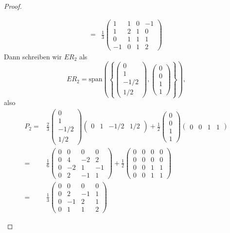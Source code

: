 \begin{proof}
\begin{parts}
\begin{align*}
			=&\frac{1}{3} \begin{pmatrix} 1 & 1 & 0 & -1 \\ 1 & 2 & 1 & 0 \\ 0 & 1 & 1 & 1 \\ -1 & 0 & 1 & 2 \end{pmatrix} 
		\end{align*}
		Dann schreiben wir $ER_2$ als
		\[
			ER_2=\text{span}\left( \left\{ \begin{pmatrix} 0 \\ 1 \\ -1 / 2 \\ 1 /2 \end{pmatrix} , \begin{pmatrix} 0 \\ 0 \\ 1 \\ 1 \end{pmatrix}  \right\}  \right) 
		,\]
		also
		\begin{align*}
			P_2=&\frac{2}{3}\begin{pmatrix}  0 \\ 1 \\ -1 / 2 \\ 1 / 2 \end{pmatrix} \begin{pmatrix}  0 & 1 & -1 / 2 & 1 / 2 \end{pmatrix} +\frac{1}{2}\begin{pmatrix}  0 \\ 0 \\ 1 \\ 1 \end{pmatrix} \begin{pmatrix} 0 & 0 & 1 & 1 \end{pmatrix}\\
			=&\frac{1}{6}\begin{pmatrix} 0 & 0 & 0 & 0 \\ 0 & 4 & -2 & 2 \\ 0 & -2 & 1 & -1 \\ 0 & 2 & -1 & 1 \end{pmatrix}+\frac{1}{2}\begin{pmatrix} 0 & 0 & 0 & 0 \\ 0 & 0 & 0 & 0 \\ 0 & 0 & 1 & 1 \\ 0 & 0 & 1 & 1 \end{pmatrix} \\
			=& \frac{1}{3}\begin{pmatrix}  0 & 0 & 0 & 0 \\ 0 & 2 & -1 & 1 \\ 0 & -1 & 2 & 1 \\ 0 & 1 & 1 & 2 \end{pmatrix} 
		\end{align*}
	\end{parts}
\end{proof}

